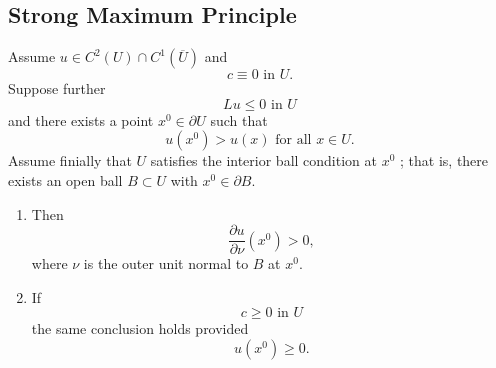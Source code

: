 \subsection{Strong Maximum Principle}
\begin{lemma}
  Assume $u\in C^{2}(U)\cap C^1(\overline{U})$ and 
  \[
  c\equiv 0 \text{ in } U.
  \] 
  Suppose further 
  \[
  Lu\le 0 \text{ in }U
  \] 
  and there exists a point $x^{0}\in \partial U$ such that 
  \begin{equation}
    u(x^0)>u(x)\text{ for all }x\in U.
  \end{equation}
  Assume finially that $U$ satisfies the interior ball condition at $x^{0}$ ; that is, there exists an open ball $B\subset U$ with $x^{0}\in \partial B$.
  \begin{enumerate}
    \item Then 
      \[
	\frac{\partial u}{\partial \nu} (x^{0})>0,
      \] 
      where $\nu$ is the outer unit normal to $B$ at $x^{0}$.
    \item If 
      \[
      c\ge 0 \text{ in }U
      \] 
      the same conclusion holds provided 
      \[
	u(x^{0})\ge 0.
      \] 
  \end{enumerate}
\end{lemma}
